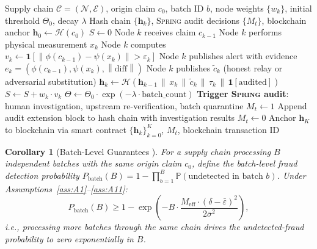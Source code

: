 \documentclass[11pt,a4paper]{article}
\newtheorem{corollary}[theorem]{Corollary}
\theoremstyle{definition}
\theoremstyle{remark}
\newcommand{\Spring}{\textsc{Spring}}
\newcommand{\Pbb}{\mathbb{P}}
\newcommand{\ind}[1]{\mathbf{1}[#1]}
\newcommand{\norm}[1]{\left\lVert#1\right\rVert}
\newcommand{\chain}{\mathcal{C}}
\newcommand{\nodeSet}{\mathcal{N}}
\newcommand{\hashFunc}{\mathcal{H}}
\newcommand{\hashChain}{\mathbf{h}}
\begin{document}
\begin{algorithm}[htbp]
\caption{\Spring{}-Gated Supply Chain Audit Protocol Spring}
\label{alg:spring_audit}
\begin{algorithmic}[1]
\Require Supply chain $\chain = (\nodeSet, \mathcal{E})$, origin claim $c_0$, batch ID $b$, node weights $\{w_k\}$, initial threshold $\Theta_0$, decay $\lambda$
\Ensure Hash chain $\{\hashChain_k\}$, \Spring{} audit decisions $\{M_t\}$, blockchain anchor
\State $\hashChain_0 \gets \hashFunc(c_0)$
\State $S \gets 0$ 
    \State Node $k$ receives claim $c_{k-1}$
    \State Node $k$ performs physical measurement $x_k$
    \State Node $k$ computes $v_k \gets \ind{\norm{\phi(c_{k-1}) - \psi(x_k)} > \varepsilon_k}$
        \State Node $k$ publishes alert with evidence $e_k = (\phi(c_{k-1}), \psi(x_k), \norm{\text{diff}})$
    \EndIf
    \State Node $k$ publishes $\tilde{c}_k$ (honest relay or adversarial substitution)
    \State $\hashChain_k \gets \hashFunc(\hashChain_{k-1} \,\|\, x_k \,\|\, \tilde{c}_k \,\|\, \tau_k \,\|\, \ind{\text{audited}})$
    \State $S \gets S + w_k \cdot v_k$
\EndFor
\State $\Theta \gets \Theta_0 \cdot \exp(-\lambda \cdot \text{batch\_count})$
    \State \textbf{Trigger \Spring{} audit}: human investigation, upstream re-verification, batch quarantine
    \State $M_t \gets 1$
    \State Append audit extension block to hash chain with investigation results
\Else
    \State $M_t \gets 0$
\EndIf
\State Anchor $\hashChain_K$ to blockchain via smart contract
\State \Return $\{\hashChain_k\}_{k=0}^K$, $M_t$, blockchain transaction ID
\end{algorithmic}
\end{algorithm}

\begin{corollary}[Batch-Level Guarantees ]
\label{cor:batch_guarantees}
For a supply chain processing $B$ independent batches with the same origin claim $c_0$, define the batch-level fraud detection probability $P_{\text{batch}}(B) = 1 - \prod_{b=1}^{B} \Pbb(\text{undetected in batch } b)$. Under Assumptions~\ref{ass:A1}--\ref{ass:A11}:
\begin{equation}
    P_{\text{batch}}(B) \geq 1 - \exp\left(-B \cdot \frac{M_{\mathrm{eff}} \cdot (\delta - \bar{\varepsilon})^2}{2\bar{\sigma}^2}\right),
    \label{eq:batch_detection}
\end{equation}
i.e., processing more batches through the same chain drives the undetected-fraud probability to zero exponentially in $B$.
\end{corollary}
\end{document}
